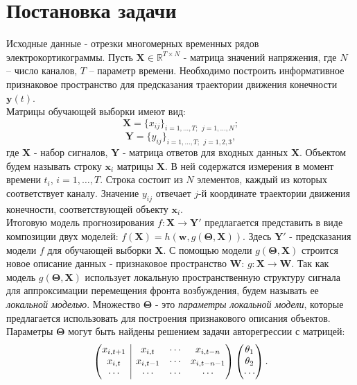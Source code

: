 \documentclass[12pt,twoside]{article}
\begin{document}
\section{Постановка задачи}
Исходные данные - отрезки многомерных временных рядов электрокортикограммы. Пусть $\mathbf{X} \in \mathbb{R}^{T \times N}$ - матрица значений напряжения, где $N$ – число каналов, $T$ – параметр времени. Необходимо построить информативное признаковое пространство для предсказания траектории движения конечности $\mathbf{y}(t)$. \\
Матрицы обучающей выборки имеют вид:
\begin{equation}
\mathbf{X} = \{x_{ij}\}_{i=1,\dots,T;\ \ j=1,\dots,N};
\end{equation} 
\begin{equation}
\mathbf{Y} = \{y_{ij}\}_{i=1,\dots,T;\ \ j=1,2,3},
\end{equation}
где $\mathbf{X}$ - набор сигналов, $\mathbf{Y}$ - матрица ответов для входных данных $\mathbf{X}$. Объектом будем называть строку $\mathbf{x}_i$ матрицы $\mathbf{X}$. В ней содержатся измерения в момент времени $t_i$, $i = 1,\dots,T$. Строка состоит из $N$ элементов, каждый из которых соответствует каналу. Значение $y_{ij}$ отвечает $j$-й координате траектории движения конечности, соответствующей объекту $\mathbf{x}_i$.\\
Итоговую модель прогнозирования $f:\mathbf{X}\to\mathbf{Y}'$ предлагается представить в виде композиции двух моделей: $f(\mathbf{X})=h(\mathbf{w}, g(\mathbf{\Theta}, \mathbf{X}))$. Здесь $\mathbf{Y}'$ - предсказания модели $f$ для обучающей выборки $\mathbf{X}$. С помощью модели $g(\mathbf{\Theta}, \mathbf{X})$ строится новое описание данных - признаковое пространство $\mathbf{W}$: $g:\mathbf{X}\to\mathbf{W}$. Так как модель $g(\mathbf{\Theta}, \mathbf{X})$ использует локальную пространственную структуру сигнала для аппроксимации перемещения фронта возбуждения, будем называть ее \textit{локальной моделью}.
Множество $\mathbf{\Theta}$ - это \textit{параметры локальной модели}, которые предлагается использовать для построения признакового описания объектов. Параметры $\mathbf{\Theta}$ могут быть найдены решением задачи авторегрессии с матрицей:
\begin{equation}
\left(\begin{array}{@{}c|ccc@{}}
x_{i, t+1} & x_{i, t}   & \cdots & x_{i, t-n}   \\
x_{i, t}   & x_{i, t-1} & \cdots & x_{i, t-n-1} \\
\cdots     & \cdots     & \cdots & \cdots
\end{array}\right)
\begin{pmatrix}
\theta_1 \\
\theta_2 \\
\cdots
\end{pmatrix}.
\end{equation}
\end{document}
